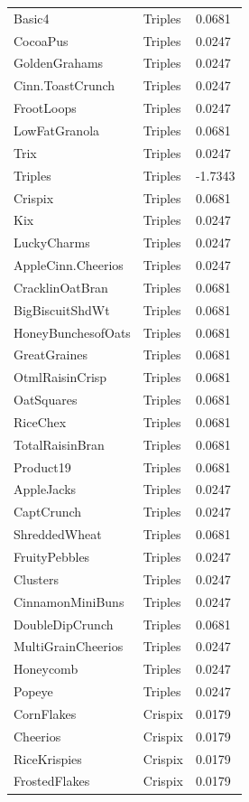 \begin{table}[!htbp]
\begin{tabular}{lll}
\\
Basic4 & Triples & 0.0681
\\
CocoaPus & Triples & 0.0247
\\
GoldenGrahams & Triples & 0.0247
\\
Cinn.ToastCrunch & Triples & 0.0247
\\
FrootLoops & Triples & 0.0247
\\
LowFatGranola & Triples & 0.0681
\\
Trix & Triples & 0.0247
\\
Triples & Triples & -1.7343
\\
Crispix & Triples & 0.0681
\\
Kix & Triples & 0.0247
\\
LuckyCharms & Triples & 0.0247
\\
AppleCinn.Cheerios & Triples & 0.0247
\\
CracklinOatBran & Triples & 0.0681
\\
BigBiscuitShdWt & Triples & 0.0681
\\
HoneyBunchesofOats & Triples & 0.0681
\\
GreatGraines & Triples & 0.0681
\\
OtmlRaisinCrisp & Triples & 0.0681
\\
OatSquares & Triples & 0.0681
\\
RiceChex & Triples & 0.0681
\\
TotalRaisinBran & Triples & 0.0681
\\
Product19 & Triples & 0.0681
\\
AppleJacks & Triples & 0.0247
\\
CaptCrunch & Triples & 0.0247
\\
ShreddedWheat & Triples & 0.0681
\\
FruityPebbles & Triples & 0.0247
\\
Clusters & Triples & 0.0247
\\
CinnamonMiniBuns & Triples & 0.0247
\\
DoubleDipCrunch & Triples & 0.0681
\\
MultiGrainCheerios & Triples & 0.0247
\\
Honeycomb & Triples & 0.0247
\\
Popeye & Triples & 0.0247
\\
CornFlakes & Crispix & 0.0179
\\
Cheerios & Crispix & 0.0179
\\
RiceKrispies & Crispix & 0.0179
\\
FrostedFlakes & Crispix & 0.0179

\end{tabular}
\end{table}
